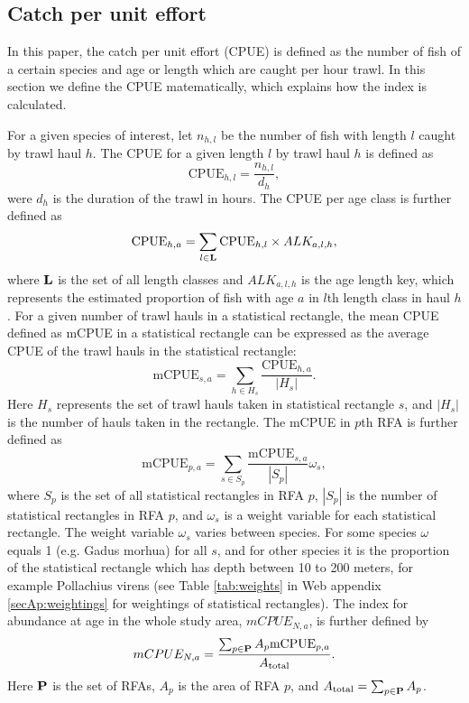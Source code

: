 \documentclass[a4paper 12pt]{article}
\numberwithin{equation}{section}
\begin{document}
\subsection{Catch per unit effort}
\label{sec:cpueestimators}
In this paper, the catch per unit effort (CPUE) is defined as the number of fish of a certain species and age or length which are caught per hour trawl. In this section we define the CPUE matematically, which explains how the index is calculated. 

For a given species of interest, let $n_{h,l}$ be the number of fish with length $l$ caught by trawl haul $h$. The CPUE for a given length $l$ by trawl haul $h$ is defined as 
\begin{equation}\label{eq:cpueHaul}
\mathrm{CPUE}_{h,l} =\frac{n_{h,l}}{d_h},
\end{equation}
were $d_h$ is the duration of the trawl in hours. The CPUE per age class is further defined as
\begin{equation}\label{eq:cpueALK}
\mathrm{CPUE}_{h,a} =\sum_{l \in {\bf L}}\mathrm{CPUE}_{h, l} \times ALK_{a,l,h},
\end{equation}
where ${\bf L}$ is the set of all length classes and $ALK_{a,l,h}$ is the age length key, which represents the estimated proportion of fish with age $a$ in $l$th length class in haul $h$. For a given number of trawl hauls in a statistical rectangle, the mean CPUE defined as  mCPUE  in a statistical rectangle can be expressed as the average CPUE of the trawl hauls in the statistical rectangle:
\begin{equation}\label{eq:cpueRec}
\mathrm{mCPUE}_{s,a} =\sum_{h \in H_{s}}\frac{\mathrm{CPUE}_{h,a}}{|H_{s}|}.
\end{equation}
Here $H_{s}$ represents the set of trawl hauls taken in statistical rectangle $s$, and $|H_{s}|$ is the number of hauls taken in the rectangle. The mCPUE in $p$th RFA is further defined as
\begin{equation}\label{eq:cpueRFA}
\mathrm{mCPUE}_{p,a} = \sum_{s \in S_{p}} \frac{\mathrm{mCPUE}_{s,a}}{|S_{p}|} \omega_s,
\end{equation}
where $S_{p}$ is the set of all statistical rectangles in RFA $p$, $|S_{p}|$ is the number of statistical rectangles in RFA $p$, and $\omega_s$ is a weight variable for each statistical rectangle. The weight variable $\omega_s$ varies between species. For some species $\omega$ equals 1 (e.g. Gadus morhua) for all $s$, and for other species it is the proportion of the statistical rectangle which has depth between 10 to 200 meters, for example Pollachius virens (see Table \ref{tab:weights} in Web appendix \ref{secAp:weightings}  for weightings of statistical rectangles).  The index for abundance at age in the whole study area, $mCPUE_{N,a} $, is further defined by
\begin{equation}
mCPUE_{N,a} = \frac{\sum_{p\in {\bf P}} A_{p}  \mathrm{mCPUE}_{p,a}}{A_{\text{total}}}.
\label{abundanceestimatornorthsea}
\end{equation}
Here ${\bf P}$ is the set of RFAs, $A_p$ is the area of RFA $p$, and $A_{\text{total}} = \sum_{p\in {\bf P}} A_{p}$.
\end{document}
